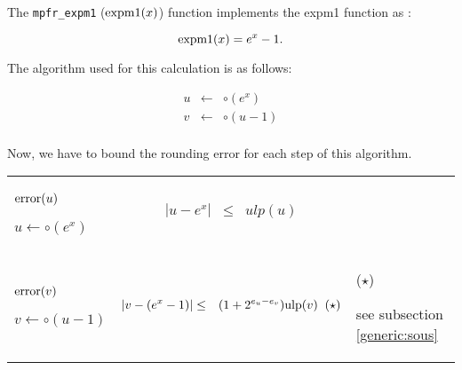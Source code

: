 \documentclass[12pt]{amsart}
\def\n{\textnormal}
\def\ulp{{\rm ulp}}
\begin{document}
The {\tt mpfr\_expm1} ($\n{expm1}(x)$) function implements the expm1 function  as :

\[
\textnormal{expm1} (x) = e^x -1.
\]

The algorithm used for this calculation is as follows:

\begin{eqnarray}\nonumber
u&\leftarrow&\circ(e^x)\\\nonumber
v&\leftarrow&\circ(u-1)\\\nonumber
\end{eqnarray}

Now, we have to bound the rounding error for each step of this
algorithm.


\begin{center}
\begin{tabular}{l l l}

\begin{minipage}{2.5cm}


${\textnormal{error}}(u)$


$u \leftarrow \circ(e^x)$

\end{minipage} &
\begin{minipage}{7.5cm}

\begin{eqnarray}\nonumber
  |u-e^x| &\leq& ulp(u)\\\nonumber
\end{eqnarray}

\end{minipage} &
\begin{minipage}{6cm}
{\hspace{7cm}}
\end{minipage}\\%
\begin{minipage}{2.5cm}
${\textnormal{error}}(v)$


$v \leftarrow \circ(u-1) $

\end{minipage} &
\begin{minipage}{7.5cm}

\begin{eqnarray}\nonumber
  |v-(e^x-1)| &\leq& (1+2^{e_u-e_v})\ulp(v)\;\;(\star)
\end{eqnarray}


\end{minipage} &
\begin{minipage}{6cm}
($\star$)

see subsection \ref{generic:sous}


\end{minipage}
\end{tabular}
\end{center}
\end{document}
